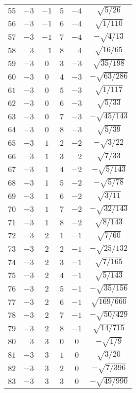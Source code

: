 \begin{table}
\begin{center}
\begin{tabular}{|c|c|c|c|c|c|}
$55$ & $-3$ & $-1$ & $5$ & $-4$ & $\sqrt{5/26}$ \\ 
$56$ & $-3$ & $-1$ & $6$ & $-4$ & $\sqrt{1/110}$ \\ 
$57$ & $-3$ & $-1$ & $7$ & $-4$ & $-\sqrt{4/13}$ \\ 
$58$ & $-3$ & $-1$ & $8$ & $-4$ & $\sqrt{16/65}$ \\ 
$59$ & $-3$ & $0$ & $3$ & $-3$ & $\sqrt{35/198}$ \\ 
$60$ & $-3$ & $0$ & $4$ & $-3$ & $-\sqrt{63/286}$ \\ 
$61$ & $-3$ & $0$ & $5$ & $-3$ & $\sqrt{1/117}$ \\ 
$62$ & $-3$ & $0$ & $6$ & $-3$ & $\sqrt{5/33}$ \\ 
$63$ & $-3$ & $0$ & $7$ & $-3$ & $-\sqrt{45/143}$ \\ 
$64$ & $-3$ & $0$ & $8$ & $-3$ & $\sqrt{5/39}$ \\ 
$65$ & $-3$ & $1$ & $2$ & $-2$ & $-\sqrt{3/22}$ \\ 
$66$ & $-3$ & $1$ & $3$ & $-2$ & $\sqrt{7/33}$ \\ 
$67$ & $-3$ & $1$ & $4$ & $-2$ & $-\sqrt{5/143}$ \\ 
$68$ & $-3$ & $1$ & $5$ & $-2$ & $-\sqrt{5/78}$ \\ 
$69$ & $-3$ & $1$ & $6$ & $-2$ & $\sqrt{3/11}$ \\ 
$70$ & $-3$ & $1$ & $7$ & $-2$ & $-\sqrt{32/143}$ \\ 
$71$ & $-3$ & $1$ & $8$ & $-2$ & $\sqrt{8/143}$ \\ 
$72$ & $-3$ & $2$ & $1$ & $-1$ & $\sqrt{7/60}$ \\ 
$73$ & $-3$ & $2$ & $2$ & $-1$ & $-\sqrt{25/132}$ \\ 
$74$ & $-3$ & $2$ & $3$ & $-1$ & $\sqrt{7/165}$ \\ 
$75$ & $-3$ & $2$ & $4$ & $-1$ & $\sqrt{5/143}$ \\ 
$76$ & $-3$ & $2$ & $5$ & $-1$ & $-\sqrt{35/156}$ \\ 
$77$ & $-3$ & $2$ & $6$ & $-1$ & $\sqrt{169/660}$ \\ 
$78$ & $-3$ & $2$ & $7$ & $-1$ & $-\sqrt{50/429}$ \\ 
$79$ & $-3$ & $2$ & $8$ & $-1$ & $\sqrt{14/715}$ \\ 
$80$ & $-3$ & $3$ & $0$ & $0$ & $-\sqrt{1/9}$ \\ 
$81$ & $-3$ & $3$ & $1$ & $0$ & $\sqrt{3/20}$ \\ 
$82$ & $-3$ & $3$ & $2$ & $0$ & $-\sqrt{7/396}$ \\ 
$83$ & $-3$ & $3$ & $3$ & $0$ & $-\sqrt{49/990}$ \\ 

\end{tabular}
\end{center}
\end{table}
